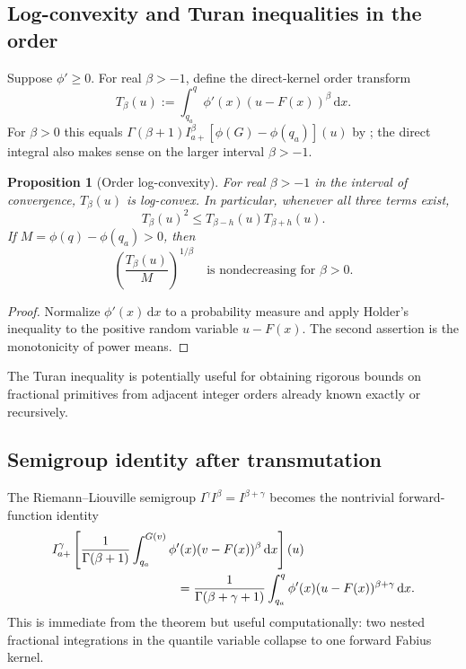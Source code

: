 \documentclass[11pt,oneside]{article}
\newtheorem{proposition}[theorem]{Proposition}
\theoremstyle{definition}
\theoremstyle{remark}
\newcommand{\dd}{\,\mathrm d}
\begin{document}
\subsection{Log-convexity and Turan inequalities in the order}

Suppose $\phi'\ge0$.  For real $\beta>-1$, define the direct-kernel
order transform
\begin{equation}
 T_\beta(u)
 :=\int_{q_a}^{q}\phi'(x)(u-F(x))^\beta\dd x.
 \label{eq:T-beta-def}
\end{equation}
For $\beta>0$ this equals
$\Gamma(\beta+1)I_{a+}^{\beta}[\phi(G)-\phi(q_a)](u)$ by
; the direct integral also makes sense on
the larger interval $\beta>-1$.

\begin{proposition}[Order log-convexity]
For real $\beta>-1$ in the interval of convergence, $T_\beta(u)$ is
log-convex.  In particular, whenever all three terms exist,
\begin{equation}
 T_\beta(u)^2\le T_{\beta-h}(u)T_{\beta+h}(u).
 \label{eq:Turan-order}
\end{equation}
If $M=\phi(q)-\phi(q_a)>0$, then
\begin{equation}
 \left(\frac{T_\beta(u)}{M}\right)^{1/\beta}
 \quad\text{is nondecreasing for }\beta>0.
 \label{eq:power-mean-order}
\end{equation}
\end{proposition}

\begin{proof}
Normalize $\phi'(x)\dd x$ to a probability measure and apply Holder's
inequality to the positive random variable $u-F(x)$.  The second assertion
is the monotonicity of power means.
\end{proof}

The Turan inequality is potentially useful for obtaining rigorous bounds on
fractional primitives from adjacent integer orders already known exactly or
recursively.

\subsection{Semigroup identity after transmutation}

The Riemann--Liouville semigroup $I^{\gamma}I^{\beta}=I^{\beta+\gamma}$
becomes the nontrivial forward-function identity
\begin{align}
 &I_{a+}^{\gamma}\left[
 \frac1{\Gamma(\beta+1)}
 \int_{q_a}^{G(v)}\phi'(x)(v-F(x))^\beta\dd x
 \right](u)\notag\\
 &\hspace{35mm}=
 \frac1{\Gamma(\beta+\gamma+1)}
 \int_{q_a}^{q}\phi'(x)(u-F(x))^{\beta+\gamma}\dd x.
 \label{eq:transmuted-semigroup}
\end{align}
This is immediate from the theorem but useful computationally: two nested
fractional integrations in the quantile variable collapse to one forward
Fabius kernel.
\end{document}
